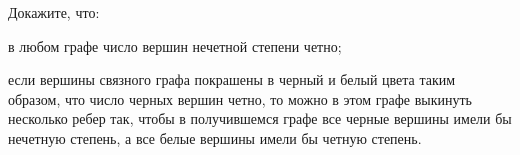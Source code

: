 Докажите, что:
\begin{enumcyr}
    \item в любом графе число вершин нечетной степени четно;
    \item если вершины связного графа покрашены в черный и белый цвета таким образом, что число черных вершин
	    четно, то можно в этом графе выкинуть несколько ребер так, чтобы в получившемся графе все черные вершины имели бы
        нечетную степень, а все белые вершины имели бы четную степень.
\end{enumcyr}